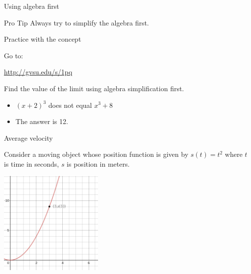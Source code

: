 \documentclass{beamer}
\begin{document}
\begin{frame}{Using algebra first}
    \begin{block}{Pro Tip}
    Always try to simplify the algebra first. 
    \end{block}
    
\end{frame}

\begin{frame}{Practice with the concept}
    
    Go to: 
    
    \begin{center}
        \url{http://gvsu.edu/s/1pq}
    \end{center}
    
Find the value of the limit using algebra simplification first. 

\begin{itemize}
    \item $(x+2)^3$ does not equal $x^3 + 8$
    \item The answer is 12. 
\end{itemize}
    
\end{frame}

\begin{frame}{Average velocity}

    Consider a moving object whose position function is given by $s(t) = t^2$ where $t$ is time in seconds, $s$ is position in meters. 
    
    \begin{center}
        \includegraphics[width=2in]{1b-in-2.png}
    \end{center}
    
    \end{frame}
    
\end{document}
